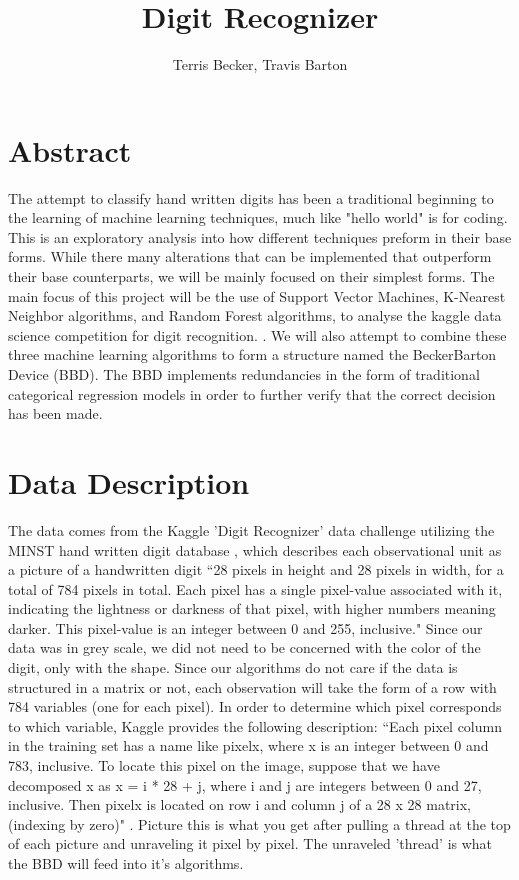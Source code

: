 \documentclass[11pt, oneside]{article}   	%
\title{Digit Recognizer}
\author{Terris Becker, Travis Barton}
\begin{document}
\maketitle
\section{Abstract}
The attempt to classify hand written digits has been a traditional beginning to the learning of machine learning techniques, much like "hello world" is for coding. This is an exploratory analysis into how different techniques preform in their base forms. While there many alterations that can be implemented that outperform their base counterparts, we will be mainly focused on their simplest forms. The main focus of this project will be the use of Support Vector Machines, K-Nearest Neighbor algorithms, and Random Forest algorithms, to analyse the kaggle data science competition for digit recognition. \cite{kagglechallange}. We will also attempt to combine these three machine learning algorithms to form a structure named the BeckerBarton Device (BBD). The BBD implements redundancies in the form of traditional categorical regression models in order to further verify that the correct decision has been made.

\section{Data Description}
The data comes from the Kaggle 'Digit Recognizer' data challenge utilizing the MINST hand written digit database \cite{kaggledata}, which describes each observational unit as a picture of a handwritten digit ``28 pixels in height and 28 pixels in width, for a total of 784 pixels in total. Each pixel has a single pixel-value associated with it, indicating the lightness or darkness of that pixel, with higher numbers meaning darker. This pixel-value is an integer between 0 and 255, inclusive." Since our data was in grey scale, we did not need to be concerned with the color of the digit, only with the shape.
Since our algorithms do not care if the data is structured in a matrix or not, each observation will take the form of a row with 784 variables (one for each pixel). In order to determine which pixel corresponds to which variable, Kaggle provides the following description: ``Each pixel column in the training set has a name like pixelx, where x is an integer between 0 and 783, inclusive. To locate this pixel on the image, suppose that we have decomposed x as x = i * 28 + j, where i and j are integers between 0 and 27, inclusive. Then pixelx is located on row i and column j of a 28 x 28 matrix, (indexing by zero)" \cite{kaggledata}. Picture this is what you get after pulling a thread at the top of each picture and unraveling it pixel by pixel. The unraveled 'thread' is what the BBD will feed into it's algorithms.
\end{document}
